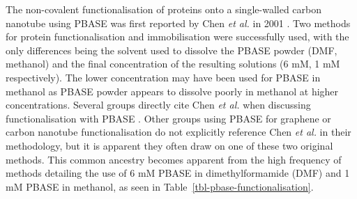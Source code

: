 \documentclass[
  a4paper,
]{scrbook}
\begin{document}
The non-covalent functionalisation of proteins onto a single-walled
carbon nanotube using PBASE was first reported by Chen \emph{et al.} in
2001 \autocite{Chen2001}. Two methods for protein functionalisation and
immobilisation were successfully used, with the only differences being
the solvent used to dissolve the PBASE powder (DMF, methanol) and the
final concentration of the resulting solutions (6 mM, 1 mM
respectively). The lower concentration may have been used for PBASE in
methanol as PBASE powder appears to dissolve poorly in methanol at
higher concentrations. Several groups directly cite Chen \emph{et al.}
when discussing functionalisation with PBASE
\autocite{Besteman2003,Cella2010,Campos2019,Zheng2016,Ohno2010}. Other
groups using PBASE for graphene or carbon nanotube functionalisation do
not explicitly reference Chen \emph{et al.} in their methodology, but it
is apparent they often draw on one of these two original methods. This
common ancestry becomes apparent from the high frequency of methods
detailing the use of 6 mM PBASE in dimethylformamide (DMF) and 1 mM
PBASE in methanol, as seen in Table~\ref{tbl-pbase-functionalisation}.
\end{document}
